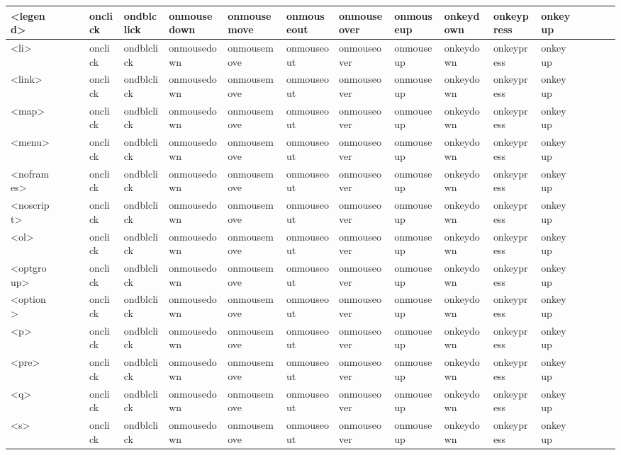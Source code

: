 \begin{center}
\begin{landscape}
\begin{longtable}{|l|l|l|l|l|l|l|l|l|l|l|l|l|l|l|l|l|l|}
\hline
<legend>		&	&	&	& onclick	& ondblclick & onmousedown & onmousemove & onmouseout & onmouseover & onmouseup & onkeydown & onkeypress & onkeyup & & & & \\
\hline
<li>			&	&	&	& onclick	& ondblclick & onmousedown & onmousemove & onmouseout & onmouseover & onmouseup & onkeydown & onkeypress & onkeyup & & & & \\
\hline
<link>		&	&	&	& onclick	& ondblclick & onmousedown & onmousemove & onmouseout & onmouseover & onmouseup & onkeydown & onkeypress & onkeyup & & & & \\
\hline
<map>		&	&	&	& onclick	& ondblclick & onmousedown & onmousemove & onmouseout & onmouseover & onmouseup & onkeydown & onkeypress & onkeyup & & & & \\
\hline
<menu>		&	&	&	& onclick	& ondblclick & onmousedown & onmousemove & onmouseout & onmouseover & onmouseup & onkeydown & onkeypress & onkeyup & & & & \\
\hline
<noframes>	&	&	&	& onclick	& ondblclick & onmousedown & onmousemove & onmouseout & onmouseover & onmouseup & onkeydown & onkeypress & onkeyup & & & & \\
\hline
<noscript>	&	&	&	& onclick	& ondblclick & onmousedown & onmousemove & onmouseout & onmouseover & onmouseup & onkeydown & onkeypress & onkeyup & & & & \\
\hline
<ol>			&	&	&	& onclick	& ondblclick & onmousedown & onmousemove & onmouseout & onmouseover & onmouseup & onkeydown & onkeypress & onkeyup & & & & \\
\hline
<optgroup>	&	&	&	& onclick	& ondblclick & onmousedown & onmousemove & onmouseout & onmouseover & onmouseup & onkeydown & onkeypress & onkeyup & & & & \\
\hline
<option>		&	&	&	& onclick	& ondblclick & onmousedown & onmousemove & onmouseout & onmouseover & onmouseup & onkeydown & onkeypress & onkeyup & & & & \\
\hline
<p>			&	&	&	& onclick	& ondblclick & onmousedown & onmousemove & onmouseout & onmouseover & onmouseup & onkeydown & onkeypress & onkeyup & & & & \\
\hline
<pre>		&	&	&	& onclick	& ondblclick & onmousedown & onmousemove & onmouseout & onmouseover & onmouseup & onkeydown & onkeypress & onkeyup & & & & \\
\hline
<q>			&	&	&	& onclick	& ondblclick & onmousedown & onmousemove & onmouseout & onmouseover & onmouseup & onkeydown & onkeypress & onkeyup & & & & \\
\hline
<s>			&	&	&	& onclick	& ondblclick & onmousedown & onmousemove & onmouseout & onmouseover & onmouseup & onkeydown & onkeypress & onkeyup & & & & \\

\end{longtable}
\end{landscape}
\end{center}
